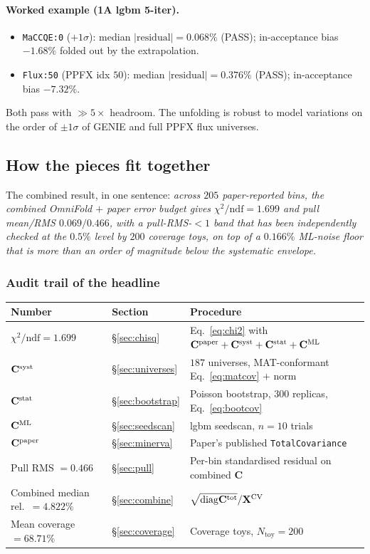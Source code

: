 \paragraph{Worked example (1A lgbm 5-iter).}
\begin{itemize}[nosep]
  \item \texttt{MaCCQE:0} ($+1\sigma$): median $|\text{residual}|=\boxed{0.068\%}$ (PASS);
        in-acceptance bias $-1.68\%$ folded out by the extrapolation.
  \item \texttt{Flux:50} (PPFX idx $50$): median $|\text{residual}|=
        \boxed{0.376\%}$ (PASS); in-acceptance bias $-7.32\%$.
\end{itemize}
Both pass with $\gg 5\times$ headroom. The unfolding is robust to
model variations on the order of $\pm 1\sigma$ of GENIE and full PPFX
flux universes.

\subsection{How the pieces fit together}
\label{sec:assemble}

The combined result, in one sentence:
\emph{across $205$ paper-reported bins, the
combined OmniFold $+$ paper error budget gives $\chi^{2}/\mathrm{ndf} =
1.699$ and pull mean/RMS $0.069/0.466$, with a pull-RMS-$<1$ band
that has been independently checked at the $0.5\%$ level by $200$
coverage toys, on top of a $0.166\%$ ML-noise floor that is more than
an order of magnitude below the systematic envelope.}

\subsubsection*{Audit trail of the headline}

\begin{center}
\begin{tabular}{@{}lll@{}}
\toprule
Number & Section & Procedure \\
\midrule
$\chi^{2}/\mathrm{ndf} = 1.699$ & \S\ref{sec:chisq} &
  Eq.~\eqref{eq:chi2} with $\mathbf{C}^{\text{paper}}+\mathbf{C}^{\text{syst}}+\mathbf{C}^{\text{stat}}+\mathbf{C}^{\text{ML}}$ \\
$\mathbf{C}^{\text{syst}}$ & \S\ref{sec:universes} &
  $187$ universes, MAT-conformant Eq.~\eqref{eq:matcov} $+$ norm \\
$\mathbf{C}^{\text{stat}}$ & \S\ref{sec:bootstrap} &
  Poisson bootstrap, $300$ replicas, Eq.~\eqref{eq:bootcov} \\
$\mathbf{C}^{\text{ML}}$ & \S\ref{sec:seedscan} & lgbm seedscan, $n=10$ trials \\
$\mathbf{C}^{\text{paper}}$ & \S\ref{sec:minerva} & Paper's published \texttt{TotalCovariance} \\
Pull RMS $= 0.466$ & \S\ref{sec:pull} &
  Per-bin standardised residual on combined $\mathbf{C}$ \\
Combined median rel.\ $= 4.822\%$ & \S\ref{sec:combine} &
  $\sqrt{\mathrm{diag}\mathbf{C}^{\text{tot}}}/\mathbf{X}^{\text{CV}}$ \\
Mean coverage $= 68.71\%$ & \S\ref{sec:coverage} &
  Coverage toys, $N_{\text{toy}}=200$ \\
\bottomrule
\end{tabular}
\end{center}

